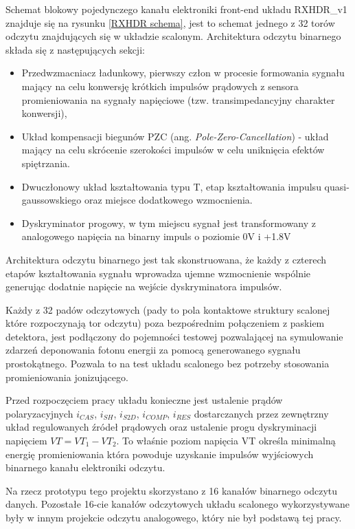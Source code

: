 Schemat blokowy pojedynczego kanału elektroniki front-end układu RXHDR\_v1 znajduje się na rysunku \ref{RXHDR schema}, jest to schemat jednego z 32 torów odczytu znajdujących się w układzie scalonym.  Architektura odczytu binarnego składa się z następujących sekcji:
\begin{itemize}
        \item Przedwzmacniacz ładunkowy, pierwszy człon w procesie formowania sygnału mający na celu konwersję krótkich impulsów prądowych z sensora promieniowania na sygnały napięciowe (tzw. transimpedancyjny charakter konwersji),
        \item Układ kompensacji biegunów PZC (ang. \textit{Pole-Zero-Cancellation}) - układ mający na celu skrócenie szerokości impulsów w celu uniknięcia efektów spiętrzania.
        \item Dwuczłonowy układ kształtowania typu T, etap kształtowania impulsu quasi-gaussowskiego oraz miejsce dodatkowego wzmocnienia. 
        \item Dyskryminator progowy, w tym miejscu sygnał jest transformowany z analogowego napięcia na binarny impuls o poziomie 0V i +1.8V
\end{itemize}

Architektura odczytu binarnego jest tak skonstruowana, że każdy z czterech etapów kształtowania sygnału wprowadza ujemne wzmocnienie wspólnie generując dodatnie napięcie na wejście dyskryminatora impulsów. 

Każdy z 32 padów odczytowych (pady to pola kontaktowe struktury scalonej które rozpoczynają tor odczytu) poza bezpośrednim połączeniem z paskiem detektora, jest podłączony do pojemności testowej pozwalającej na symulowanie zdarzeń deponowania fotonu energii za pomocą generowanego sygnału prostokątnego. Pozwala to na test układu scalonego bez potrzeby stosowania promieniowania jonizującego. 

Przed rozpoczęciem pracy układu konieczne jest ustalenie prądów polaryzacyjnych $i_{CAS}$, $i_{SH}$, $i_{S2D}$, $i_{COMP}$, $i_{RES}$ dostarczanych przez zewnętrzny układ regulowanych źródeł prądowych\cite{master} oraz ustalenie progu dyskryminacji napięciem $VT = VT_1 - VT_2$. To właśnie poziom napięcia VT określa minimalną energię promieniowania która powoduje uzyskanie impulsów wyjściowych binarnego kanału elektroniki odczytu. 

Na rzecz prototypu tego projektu skorzystano z 16 kanałów binarnego odczytu danych.  Pozostałe 16-cie kanałów odczytowych układu scalonego wykorzystywane były w innym projekcie odczytu analogowego, który nie był podstawą tej pracy. 

